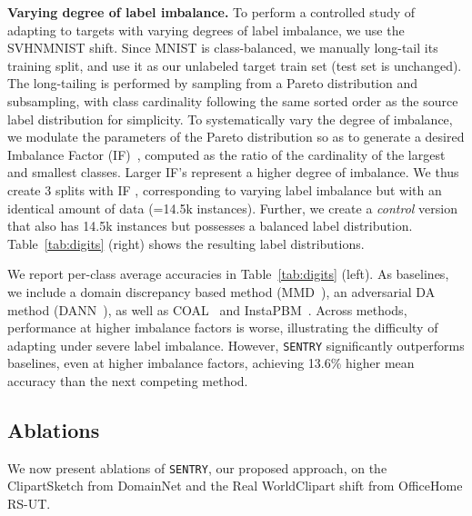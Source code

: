 \documentclass[10pt,twocolumn,letterpaper]{article}
\newcommand{\method}{\texttt{SENTRY}\xspace}
\begin{document}
\noindent \textbf{Varying degree of label imbalance.} To perform a controlled study of adapting to targets with varying degrees of label imbalance, we use the SVHNMNIST shift. Since MNIST is class-balanced, we manually long-tail its training split, and use it as our unlabeled target train set (test set is unchanged). The long-tailing is performed by sampling from a Pareto distribution and subsampling, with class cardinality following the same sorted order as the source label distribution for simplicity. To systematically vary the degree of imbalance, we modulate the parameters of the Pareto distribution so as to generate a desired Imbalance Factor (IF)~\cite{cui2019class}, computed as the ratio of the cardinality of the largest and smallest classes. Larger IF's represent a higher degree of imbalance. We thus create 3 splits with IF , corresponding to varying label imbalance but with an identical amount of data (=14.5k instances). Further, we create a \emph{control} version that also has 14.5k instances but possesses a balanced label distribution. Table~\ref{tab:digits} (right) shows the resulting label distributions.

We report per-class average accuracies in Table~\ref{tab:digits} (left). As baselines, we include a domain discrepancy based method (MMD~\cite{long2013transfer}), an adversarial DA method (DANN~\cite{ganin2014unsupervised}), as well as COAL~\cite{tan2019generalized} and InstaPBM~\cite{li2020rethinking}.
Across methods, performance at higher imbalance factors is worse, illustrating the difficulty of adapting under severe label imbalance. However, \method significantly outperforms baselines, even at higher imbalance factors, achieving 13.6\% higher mean accuracy than the next competing method. 

\vspace{-5pt}
\subsection{Ablations}
\label{ref:ablations}

\noindent We now present ablations of \method, our proposed approach, on the ClipartSketch from DomainNet and the Real WorldClipart shift from OfficeHome RS-UT.
\end{document}
